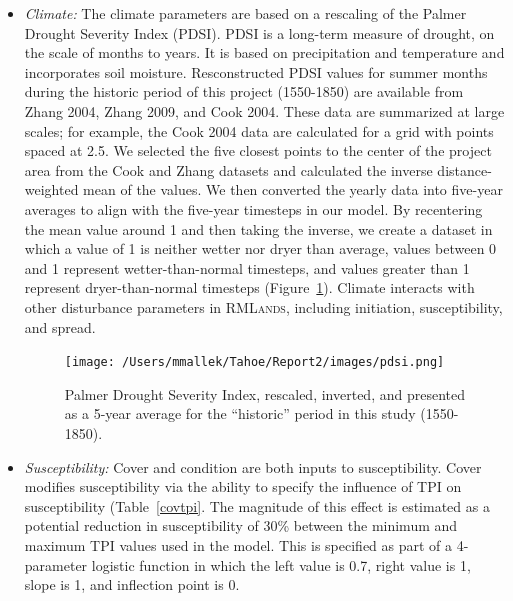 \begin{itemize}
\item \emph{Climate:} The climate parameters are based on a rescaling of the Palmer Drought Severity Index (PDSI). PDSI is a long-term measure of drought, on the scale of months to years. It is based on precipitation and temperature and incorporates soil moisture. Resconstructed PDSI values for summer months during the historic period of this project (1550-1850) are available from Zhang 2004, Zhang 2009, and Cook 2004. These data are summarized at large scales; for example, the Cook 2004 data are calculated for a grid with points spaced at 2.5\textdegree. We selected the five closest points to the center of the project area from the Cook and Zhang datasets and calculated the inverse distance-weighted mean of the values. We then converted the yearly data into five-year averages to align with the five-year timesteps in our model. By recentering the mean value around 1 and then taking the inverse, we create a dataset in which a value of 1 is neither wetter nor dryer than average, values between 0 and 1 represent wetter-than-normal timesteps, and values greater than 1 represent dryer-than-normal timesteps (Figure~\ref{pdsi}). Climate interacts with other disturbance parameters in \textsc{RMLands}, including initiation, susceptibility, and spread.

\begin{figure}[htbp]
\centering
\texttt{[image: /Users/mmallek/Tahoe/Report2/images/pdsi.png]}
\caption{Palmer Drought Severity Index, rescaled, inverted, and presented as a 5-year average for the ``historic'' period in this study (1550-1850).} 
\label{pdsi}
\end{figure}


\item \emph{Susceptibility:} Cover and condition are both inputs to susceptibility. Cover modifies susceptibility via the ability to specify the influence of TPI on susceptibility (Table~\ref{covtpi}. The magnitude of this effect is estimated as a potential reduction in susceptibility of 30\% between the minimum and maximum TPI values used in the model. This is specified as part of a 4-parameter logistic function in which the left value is 0.7, right value is 1, slope is 1, and inflection point is 0. 


\end{itemize}
